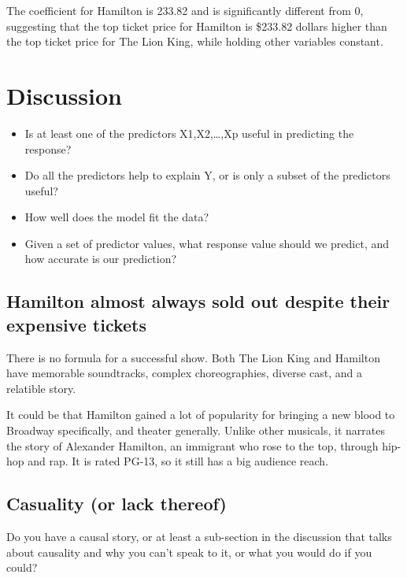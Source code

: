 \documentclass[
]{article}
\providecommand{\tightlist}{%
  \setlength{\itemsep}{0pt}\setlength{\parskip}{0pt}}
\begin{document}
The coefficient for Hamilton is 233.82 and is significantly different from 0, suggesting that the top ticket price for Hamilton is \$233.82 dollars higher than the top ticket price for The Lion King, while holding other variables constant.

\hypertarget{discussion}{%
\section{Discussion}\label{discussion}}

\begin{itemize}
\tightlist
\item
  Is at least one of the predictors X1,X2,\ldots,Xp useful in predicting the response?
\item
  Do all the predictors help to explain Y, or is only a subset of the predictors useful?
\item
  How well does the model fit the data?
\item
  Given a set of predictor values, what response value should we predict, and how accurate is our prediction?
\end{itemize}

\hypertarget{hamilton-almost-always-sold-out-despite-their-expensive-tickets}{%
\subsection{Hamilton almost always sold out despite their expensive tickets}\label{hamilton-almost-always-sold-out-despite-their-expensive-tickets}}

There is no formula for a successful show. Both The Lion King and Hamilton have memorable soundtracks, complex choreographies, diverse cast, and a relatible story.

It could be that Hamilton gained a lot of popularity for bringing a new blood to Broadway specifically, and theater generally. Unlike other musicals, it narrates the story of Alexander Hamilton, an immigrant who rose to the top, through hip-hop and rap. It is rated PG-13, so it still has a big audience reach.

\hypertarget{casuality-or-lack-thereof}{%
\subsection{Casuality (or lack thereof)}\label{casuality-or-lack-thereof}}

Do you have a causal story, or at least a sub-section in the discussion that talks about causality and why you can't speak to it, or what you would do if you could?
\end{document}
